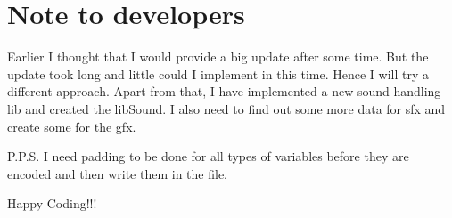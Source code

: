 \documentclass[a4paper]{article}
\begin{document}
\section{Note to developers}
Earlier I thought that I would provide a big update after some time. But the update took long and little could I implement in this time. Hence I will try a different approach. Apart from that, I have implemented a new sound handling lib and created the libSound. I also need to find out some more data for sfx and create some for the gfx.\newline

P.P.S. I need padding to be done for all types of variables before they are encoded and then write them in the file.\newline

Happy Coding!!!\newline
\pagebreak
\end{document}
